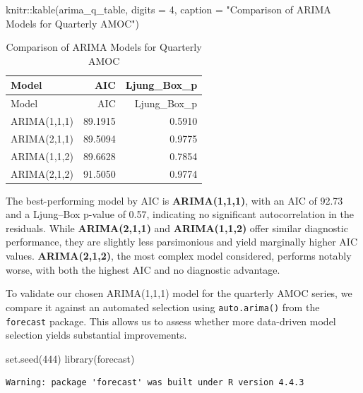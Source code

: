 \documentclass[
  11pt,
]{article}
\newenvironment{Shaded}{\begin{snugshade}}{\end{snugshade}}
\newcommand{\AttributeTok}[1]{\textcolor[rgb]{0.40,0.45,0.13}{#1}}
\newcommand{\DecValTok}[1]{\textcolor[rgb]{0.68,0.00,0.00}{#1}}
\newcommand{\FunctionTok}[1]{\textcolor[rgb]{0.28,0.35,0.67}{#1}}
\newcommand{\NormalTok}[1]{\textcolor[rgb]{0.00,0.23,0.31}{#1}}
\newcommand{\SpecialCharTok}[1]{\textcolor[rgb]{0.37,0.37,0.37}{#1}}
\newcommand{\StringTok}[1]{\textcolor[rgb]{0.13,0.47,0.30}{#1}}
\begin{document}
\begin{Shaded}
\begin{Highlighting}[]
\NormalTok{knitr}\SpecialCharTok{::}\FunctionTok{kable}\NormalTok{(arima\_q\_table, }\AttributeTok{digits =} \DecValTok{4}\NormalTok{, }\AttributeTok{caption =} \StringTok{"Comparison of ARIMA Models for Quarterly AMOC"}\NormalTok{)}
\end{Highlighting}
\end{Shaded}

\begin{longtable}[]{@{}lrr@{}}
\caption{Comparison of ARIMA Models for Quarterly AMOC}\tabularnewline
\toprule\noalign{}
Model & AIC & Ljung\_Box\_p \\
\midrule\noalign{}
\endfirsthead
\toprule\noalign{}
Model & AIC & Ljung\_Box\_p \\
\midrule\noalign{}
\endhead
\bottomrule\noalign{}
\endlastfoot
ARIMA(1,1,1) & 89.1915 & 0.5910 \\
ARIMA(2,1,1) & 89.5094 & 0.9775 \\
ARIMA(1,1,2) & 89.6628 & 0.7854 \\
ARIMA(2,1,2) & 91.5050 & 0.9774 \\
\end{longtable}

The best-performing model by AIC is \textbf{ARIMA(1,1,1)}, with an AIC
of 92.73 and a Ljung--Box p-value of 0.57, indicating no significant
autocorrelation in the residuals. While \textbf{ARIMA(2,1,1)} and
\textbf{ARIMA(1,1,2)} offer similar diagnostic performance, they are
slightly less parsimonious and yield marginally higher AIC values.
\textbf{ARIMA(2,1,2)}, the most complex model considered, performs
notably worse, with both the highest AIC and no diagnostic advantage.

To validate our chosen ARIMA(1,1,1) model for the quarterly AMOC series,
we compare it against an automated selection using \texttt{auto.arima()}
from the \texttt{forecast} package. This allows us to assess whether
more data-driven model selection yields substantial improvements.

\begin{Shaded}
\begin{Highlighting}[]
\FunctionTok{set.seed}\NormalTok{(}\DecValTok{444}\NormalTok{)}
\FunctionTok{library}\NormalTok{(forecast)}
\end{Highlighting}
\end{Shaded}

\begin{verbatim}
Warning: package 'forecast' was built under R version 4.4.3
\end{verbatim}
\end{document}
